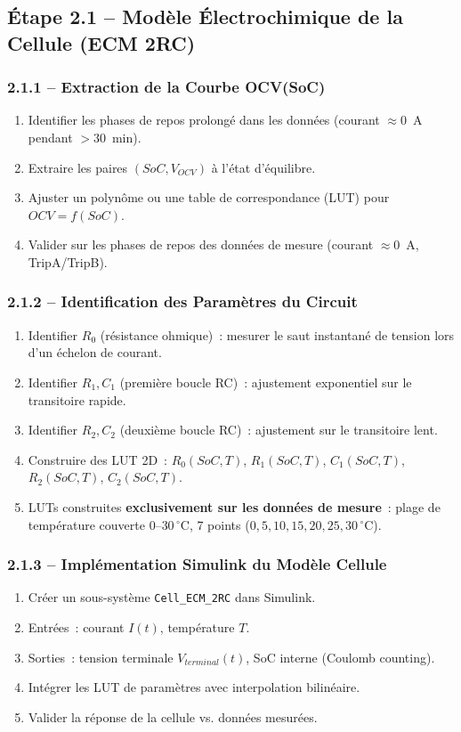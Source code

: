 \documentclass[a4paper,12pt]{article}
\begin{document}
\subsection{Étape 2.1 -- Modèle Électrochimique de la Cellule (ECM 2RC)}

\subsubsection{2.1.1 -- Extraction de la Courbe OCV(SoC)}
\begin{enumerate}[nosep]
  \item Identifier les phases de repos prolongé dans les données (courant $\approx 0$~A pendant $>30$~min).
  \item Extraire les paires $(SoC, V_{OCV})$ à l'état d'équilibre.
  \item Ajuster un polynôme ou une table de correspondance (LUT) pour $OCV = f(SoC)$.
  \item Valider sur les phases de repos des données de mesure (courant $\approx 0$~A, TripA/TripB).
\end{enumerate}

\subsubsection{2.1.2 -- Identification des Paramètres du Circuit}
\begin{enumerate}[nosep]
  \item Identifier $R_0$ (résistance ohmique)~: mesurer le saut instantané de tension lors d'un échelon de courant.
  \item Identifier $R_1, C_1$ (première boucle RC)~: ajustement exponentiel sur le transitoire rapide.
  \item Identifier $R_2, C_2$ (deuxième boucle RC)~: ajustement sur le transitoire lent.
  \item Construire des LUT 2D~: $R_0(SoC, T)$, $R_1(SoC, T)$, $C_1(SoC, T)$, $R_2(SoC, T)$, $C_2(SoC, T)$.
  \item LUTs construites \textbf{exclusivement sur les données de mesure}~: plage de température couverte $0$--$30\,^{\circ}$C, 7 points ($0, 5, 10, 15, 20, 25, 30\,^{\circ}$C).
\end{enumerate}

\subsubsection{2.1.3 -- Implémentation Simulink du Modèle Cellule}
\begin{enumerate}[nosep]
  \item Créer un sous-système \texttt{Cell\_ECM\_2RC} dans Simulink.
  \item Entrées~: courant $I(t)$, température $T$.
  \item Sorties~: tension terminale $V_{terminal}(t)$, SoC interne (Coulomb counting).
  \item Intégrer les LUT de paramètres avec interpolation bilinéaire.
  \item Valider la réponse de la cellule vs. données mesurées.
\end{enumerate}
\end{document}
